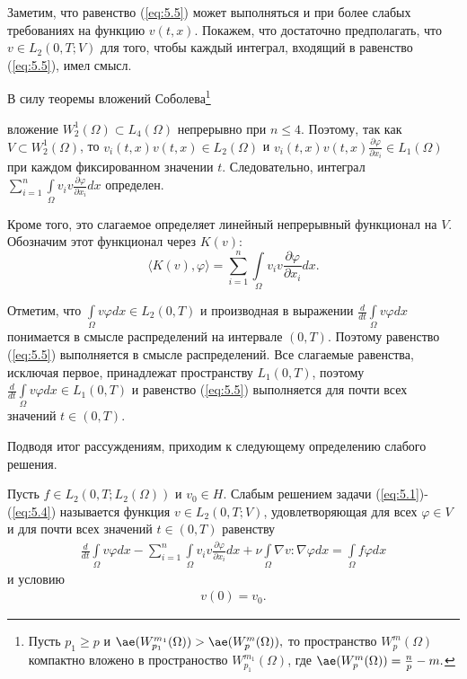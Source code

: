 Заметим, что равенство (\ref{eq:5.5}) может выполняться и при более слабых требованиях на функцию $v(t, x)$.
Покажем, что достаточно предполагать, что $v\in L_2(0, T;V)$ для того, чтобы каждый интеграл, входящий в равенство (\ref{eq:5.5}), имел смысл.

В силу теоремы вложений Соболева\footnote{ Пусть $p_1\ge p$ и $\ae(W_{p_1}^{m_1}(\Omega))>\ae(W_{p}^{m}(\Omega)),$ то пространство $W_{p}^{m}(\Omega)$ компактно
вложено в пространоство $W_{p_1}^{m_1}(\Omega)$, где $\ae(W_{p}^{m}(\Omega))=\frac{n}{p}-m.$} 

вложение $W^{1}_{2}(\Omega)\subset L_4(\Omega)$ непрерывно при $n \leqslant 4$.
Поэтому, так как $V\subset W^{1}_{2}(\Omega)$, то $v_i(t, x)v(t, x)\in L_2(\Omega)$ и $v_i(t, x)v(t, x)\frac{\partial \varphi }{\partial x_i} \in L_1(\Omega)$
при каждом фиксированном значении $t$. Следовательно, интеграл $\sum\limits_{i=1}^{n}\int\limits_\Omega v_iv \frac{\partial\varphi}{\partial x_i}dx$ определен.

Кроме того, это слагаемое определяет линейный непрерывный функционал на $V$. Обозначим этот функционал через $K(v)$:
$$\langle K(v),\varphi \rangle = \sum_{i=1}^{n}\int\limits_\Omega v_i v \frac{\partial \varphi}{\partial x_i}dx.$$

Отметим, что $\int\limits_\Omega v \varphi dx\in L_2(0, T)$ и производная в выражении \linebreak
$\frac{d}{dt}\int\limits_\Omega v \varphi dx$
понимается в смысле распределений на интервале $(0, T)$. Поэтому равенство (\ref{eq:5.5}) выполняется в смысле распределений.
Все слагаемые равенства, исключая первое, принадлежат пространству $L_1(0, T)$, поэтому $\frac{d}{dt}\int\limits_\Omega v \varphi dx\in L_1(0, T)$
и равенство (\ref{eq:5.5}) выполняется для почти всех значений $t\in (0, T)$.

Подводя итог рассуждениям, приходим к следующему определению слабого решения.
\begin{definition}
    Пусть $f\in L_2(0,T;L_2(\Omega))$ и $v_0\in H$. Слабым решением задачи (\ref{eq:5.1})-(\ref{eq:5.4}) называется функция $v\in L_2(0, T;V)$,
    удовлетворяющая для всех $\varphi \in V$ и для почти всех значений $t \in (0, T)$ равенству
    \begin{equation}\label{eq:5.6}
        \begin{gathered}
            \frac{d}{dt}\int\limits_\Omega v \varphi dx-\sum_{i=1}^{n}\int\limits_\Omega v_i v
            \frac{\partial \varphi }{\partial x_i}dx + \nu\int\limits_\Omega \nabla v :\nabla\varphi dx=
            \int\limits_\Omega f \varphi dx
        \end{gathered}
    \end{equation}
    и условию
    \begin{equation}\label{eq:5.7}
        \begin{gathered}
            v(0) = v_0.
        \end{gathered}
    \end{equation}
\end{definition}

